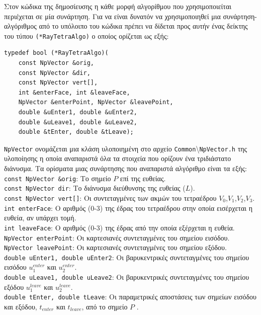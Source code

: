 Στον κώδικα της δημοσίευσης η κάθε μορφή αλγορίθμου που χρησιμοποιείται περιέχεται σε μία συνάρτηση. Για να είναι δυνατόν να χρησιμοποιηθεί μια συνάρτηση-αλγόριθμος από το υπόλοιπο του κώδικα πρέπει να δίδεται προς αυτήν ένας δείκτης του τύπου \verb!(*RayTetraAlgo)! ο οποίος ορίζεται ως εξής: 

\begin{verbatim}
typedef bool (*RayTetraAlgo)(
    const NpVector &orig, 
    const NpVector &dir,
    const NpVector vert[],
    int &enterFace, int &leaveFace,
    NpVector &enterPoint, NpVector &leavePoint,
    double &uEnter1, double &uEnter2, 
    double &uLeave1, double &uLeave2,
    double &tEnter, double &tLeave);
\end{verbatim}
\verb!NpVector! ονομάζεται μια κλάση υλοποιημένη στο αρχείο \verb!Common!\textbackslash \verb!NpVector.h! της υλοποίησης η οποία αναπαριστά όλα τα στοιχεία που ορίζουν ένα τριδιάστατο διάνυσμα. Τα ορίσματα μιας συνάρτησης που αναπαριστά αλγόριθμο είναι τα εξής:\\


\noindent \verb!const NpVector &orig!: Το σημείο $P$ επί της ευθείας.\\
\noindent \verb!const NpVector dir!: Το διάνυσμα διεύθυνσης της ευθείας ($L$).\\
\noindent \verb!const NpVector vert[]!: Οι συντεταγμένες των ακμών του τετραέδρου $V_0$,$V_1$,$V_2$,$V_3$.\\
\noindent \verb!int enterFace!: Ο αριθμός (0-3) της έδρας του τετραέδρου στην οποία εισέρχεται η ευθεία, αν υπάρχει τομή.\\
\noindent \verb!int leaveFace!: Ο αριθμός (0-3) της έδρας από την οποία εξέρχεται η ευθεία.\\
\noindent \verb!NpVector enterPoint!: Οι καρτεσιανές συντεταγμένες του σημείου εισόδου.\\
\noindent \verb!NpVector leavePoint!: Οι καρτεσιανές συντεταγμένες του σημείου εξόδου.\\
\noindent \verb!double uEnter1, double uEnter2!: Οι βαρυκεντρικές συντεταγμένες του σημείου εισόδου $u^{enter}_1$ και $u^{enter}_2$. \\
\noindent \verb!double uLeave1, double uLeave2!: Οι βαρυκεντρικές συντεταγμένες του σημείου εξόδου $u^{leave}_1$ και $u^{leave}_2$.\\
\noindent \verb!double tEnter, double tLeave!:  Οι παραμετρικές αποστάσεις των σημείων εισόδου και εξόδου, $t_{enter}$ και $t_{leave}$,  από το σημείο $P$ .\\

